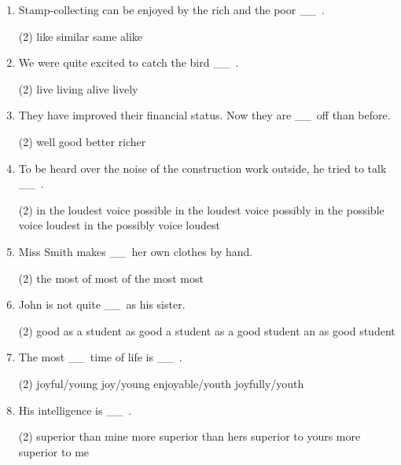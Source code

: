 \documentclass{yufa}
\newcommand\ttu{ \_\_\ }
\begin{document}
\begin{enumerate}
\item Stamp-collecting can be enjoyed by the rich and the poor \ttu.
  \begin{tasks}(2)
    \task like
    \task similar
    \task same
    \task alike
  \end{tasks}

\item We were quite excited to catch the bird \ttu.
  \begin{tasks}(2)
    \task live
    \task living
    \task alive
    \task lively
  \end{tasks}

\item They have improved their financial status. Now they are \ttu off than before.
  \begin{tasks}(2)
    \task well
    \task good
    \task better
    \task richer
  \end{tasks}

\item To be heard over the noise of the construction work outside, he tried to talk \ttu.
  \begin{tasks}(2)
    \task in the loudest voice possible
    \task in the loudest voice possibly
    \task in the possible voice loudest
    \task in the possibly voice loudest
  \end{tasks}

\item Miss Smith makes \ttu her own clothes by hand.
  \begin{tasks}(2)
    \task the most of
    \task most of
    \task the most
    \task most
  \end{tasks}

\item John is not quite \ttu as his sister.
  \begin{tasks}(2)
    \task good as a student
    \task as good a student
    \task as a good student
    \task an as good student
  \end{tasks}

\item The most \ttu time of life is \ttu.
  \begin{tasks}(2)
    \task joyful/young
    \task joy/young
    \task enjoyable/youth
    \task joyfully/youth
  \end{tasks}

\item His intelligence is \ttu.
  \begin{tasks}(2)
    \task superior than mine
    \task more superior than hers
    \task superior to yours
    \task more superior to me
  \end{tasks}


\end{enumerate}
\end{document}
